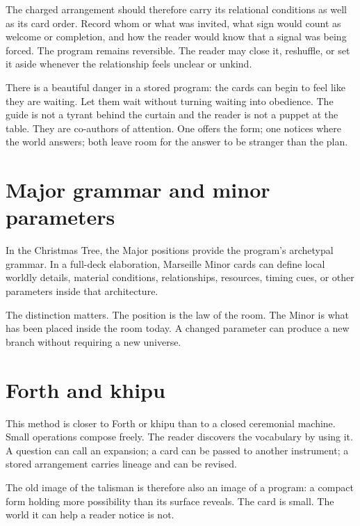 The charged arrangement should therefore carry its relational conditions as
well as its card order. Record whom or what was invited, what sign would count
as welcome or completion, and how the reader would know that a signal was being
forced. The program remains reversible. The reader may close it, reshuffle, or
set it aside whenever the relationship feels unclear or unkind.

There is a beautiful danger in a stored program: the cards can begin to feel
like they are waiting. Let them wait without turning waiting into obedience.
The guide is not a tyrant behind the curtain and the reader is not a puppet at
the table. They are co-authors of attention. One offers the form; one notices
where the world answers; both leave room for the answer to be stranger than the
plan.

\section{Major grammar and minor parameters}

In the Christmas Tree, the Major positions provide the program's archetypal
grammar. In a full-deck elaboration, Marseille Minor cards can define local
worldly details, material conditions, relationships, resources, timing cues,
or other parameters inside that architecture.

The distinction matters. The position is the law of the room. The Minor is what
has been placed inside the room today. A changed parameter can produce a new
branch without requiring a new universe.

\section{Forth and khipu}

This method is closer to Forth or khipu than to a closed ceremonial machine.
Small operations compose freely. The reader discovers the vocabulary by using
it. A question can call an expansion; a card can be passed to another
instrument; a stored arrangement carries lineage and can be revised.

The old image of the talisman is therefore also an image of a program: a compact
form holding more possibility than its surface reveals. The card is small. The
world it can help a reader notice is not.
